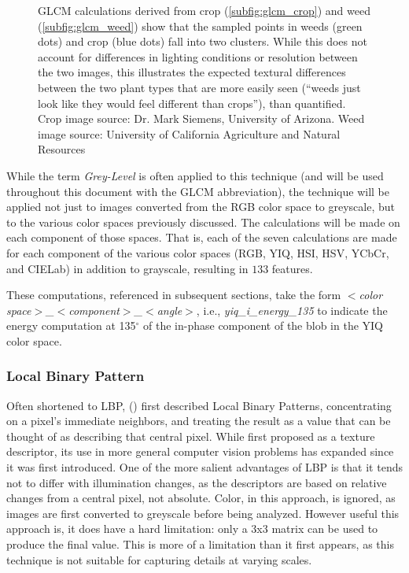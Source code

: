 \documentclass[letterpaper, notitlepage]{report}
\begin{document}
\begin{figure}[H]
\begin{subfigure}[h]{0.28\linewidth}
	\end{subfigure}%
	\hfill
	\caption[An example of GLCM calculations for weed and crop]{GLCM calculations derived from crop (\ref{subfig:glcm_crop}) and weed (\ref{subfig:glcm_weed}) show that the sampled points in weeds (green dots) and crop (blue dots) fall into two clusters. While this does not account for differences in lighting conditions or resolution between the two images, this illustrates the expected textural differences between the two plant types that are more easily seen (``weeds just look like they would feel different than crops''), than quantified. Crop image source: Dr. Mark Siemens, University of Arizona. Weed image source: University of California Agriculture and Natural Resources}
	\label{fig:glcm}
\end{figure}

While the term \textit{Grey-Level} is often applied to this technique (and will be used throughout this document with the GLCM abbreviation), the technique will be applied not just to images converted from the RGB color space to greyscale, but to the various color spaces previously discussed. The calculations will be made on each component of those spaces.  That is, each of the seven calculations are made for each component of the various color spaces (RGB, YIQ, HSI, HSV, YCbCr, and CIELab) in addition to grayscale, resulting in  $133$ features.

These computations, referenced in subsequent sections, take the form \textit{$<$color space$>$\_$<$component$>$\_$<$angle$>$}, i.e., \textit{yiq\_i\_energy\_135} to indicate the energy computation at 135$^{\circ}$ of the in-phase component of the blob in the YIQ color space.


\subsubsection{Local Binary Pattern}
Often shortened to LBP, \citeauthor{Ojala1996-ps} (\citeyear{Ojala1996-ps}) first described Local Binary Patterns, concentrating on a pixel's immediate neighbors, and treating the result as a value that can be thought of as describing that central pixel. While first proposed as a texture descriptor, its use in more general computer vision problems has expanded since it was first introduced. One of the more salient advantages of LBP is that it tends not to differ with illumination changes, as the descriptors are based on relative changes from a central pixel, not absolute. Color, in this approach, is ignored, as images are first converted to greyscale before being analyzed. However useful this approach is, it does have a hard limitation: only a 3x3 matrix can be used to produce the final value. This is more of a limitation than it first appears, as this technique is not suitable for capturing details at varying scales.
\end{document}
